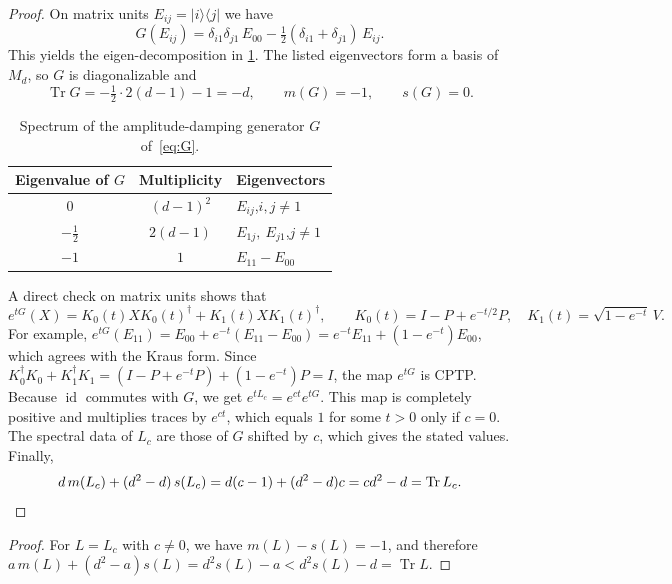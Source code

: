 \documentclass[11pt,a4paper]{article}
\theoremstyle{plain}
\newtheorem{corollary}[theorem]{Corollary}
\theoremstyle{definition}
\theoremstyle{remark}
\numberwithin{equation}{section}
\newcommand{\M}{M_d}
\newcommand{\Tr}{\operatorname{Tr}}
\newcommand{\id}{\operatorname{id}}
\newcommand{\mmin}{m}
\newcommand{\smax}{s}
\newcommand{\ketbra}[2]{\lvert #1\rangle\langle #2\rvert}
\begin{document}
\begin{proof}
On matrix units $E_{ij}=\ketbra{i}{j}$ we have
\[
  G(E_{ij})=\delta_{i1}\delta_{j1}\,E_{00}-\tfrac12(\delta_{i1}+\delta_{j1})\,E_{ij}.
\]
This yields the eigen-decomposition in \cref{tab:spectrum}. The listed eigenvectors
form a basis of $\M$, so $G$ is diagonalizable and
\[
  \Tr G=-\tfrac12\cdot2(d-1)-1=-d,\qquad \mmin(G)=-1,\qquad \smax(G)=0 .
\]

\begin{table}[ht]
\centering
\renewcommand{\arraystretch}{1.25}
\begin{tabular}{@{}ccl@{}}
\toprule
Eigenvalue of $G$ & Multiplicity & Eigenvectors\\
\midrule
$0$ & $(d-1)^2$ & $E_{ij}$,\quad $i,j\ne1$\\
$-\tfrac12$ & $2(d-1)$ & $E_{1j},\ E_{j1}$,\quad $j\ne1$\\
$-1$ & $1$ & $E_{11}-E_{00}$\\
\bottomrule
\end{tabular}
\caption{Spectrum of the amplitude-damping generator $G$ of~\eqref{eq:G}.}
\label{tab:spectrum}
\end{table}

A direct check on matrix units shows that
\[
  e^{tG}(X)=K_0(t)XK_0(t)^\dagger+K_1(t)XK_1(t)^\dagger,\qquad
  K_0(t)=I-P+e^{-t/2}P,\quad K_1(t)=\sqrt{1-e^{-t}}\,V .
\]
For example, $e^{tG}(E_{11})=E_{00}+e^{-t}(E_{11}-E_{00})=e^{-t}E_{11}+(1-e^{-t})E_{00}$,
which agrees with the Kraus form. Since
$K_0^\dagger K_0+K_1^\dagger K_1=(I-P+e^{-t}P)+(1-e^{-t})P=I$, the map $e^{tG}$ is
CPTP. Because $\id$ commutes with $G$, we get $e^{tL_c}=e^{ct}e^{tG}$. This map is
completely positive and multiplies traces by $e^{ct}$, which equals $1$ for some $t>0$
only if $c=0$. The spectral data of $L_c$ are those of $G$ shifted by $c$, which gives
the stated values. Finally,
\[
  d\,\mmin(L_c)+(d^2-d)\,\smax(L_c)=d(c-1)+(d^2-d)c=cd^2-d=\Tr L_c .
  \qedhere
\]
\end{proof}


\begin{proof}
For $L=L_c$ with $c\neq0$, we have $\mmin(L)-\smax(L)=-1$, and therefore
$a\,\mmin(L)+(d^2-a)\smax(L)=d^2\smax(L)-a<d^2\smax(L)-d=\Tr L$.
\end{proof}
\end{document}
